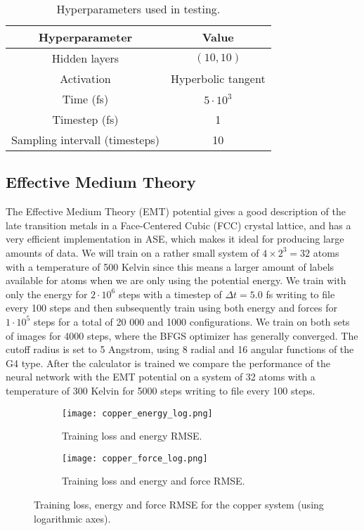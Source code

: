 \begin{table}[H]
\centering
\begin{tabular}{|c c|}
\hline
Hyperparameter & Value \\
\hline \hline
    Hidden layers & $(10, 10)$ \\
Activation & Hyperbolic tangent \\
    Time (fs) & $5 \cdot 10^3$ \\
    Timestep (fs) & 1 \\
    Sampling intervall (timesteps) & 10 \\
\hline
\end{tabular}
\caption{Hyperparameters used in testing.}
\label{tab:hyperparam-test}
\end{table}

\subsection{Effective Medium Theory}
The Effective Medium Theory (EMT) potential gives a good description
of the late transition metals in a Face-Centered Cubic (FCC) crystal
lattice, and has a very efficient implementation in ASE,
which makes it ideal for producing large amounts of data.
We will train on a rather small system of $4 \times 2^3 = 32$ atoms
with a temperature of 500 Kelvin since this means a larger amount of labels available
for atoms when we are only using the potential energy.
We train with only the energy for $2 \cdot 10^6$ steps
with a timestep of $\Delta t = 5.0$ fs
writing to file every 100 steps and then subsequently
train using both energy and forces for $1 \cdot 10^5$ steps
for a total of 20 000 and 1000 configurations. We train on both sets of images
for 4000 steps, where the BFGS optimizer has generally converged.
The cutoff radius is set to 5 Angstrom, using 8 radial and
16 angular functions of the G4 type.
After the calculator is trained we compare the performance
of the neural network with the EMT potential on a system
of 32 atoms with a temperature of 300 Kelvin for 5000 steps
writing to file every 100 steps.

\begin{figure}[H]
\begin{adjustbox}{max width=1.2\linewidth,center}
\centering
  \begin{subfigure}[b]{0.55\textwidth}
      \texttt{[image: copper\_energy\_log.png]}
      \caption{Training loss and energy RMSE.}
  \end{subfigure}
  \hfill
  \begin{subfigure}[b]{0.55\textwidth}
      \texttt{[image: copper\_force\_log.png]}
      \caption{Training loss and energy and force RMSE.}
  \end{subfigure}
\end{adjustbox}
\caption{Training loss, energy and force RMSE for the copper
    system (using logarithmic axes).}
    \label{fig:copper-log}
\end{figure}

